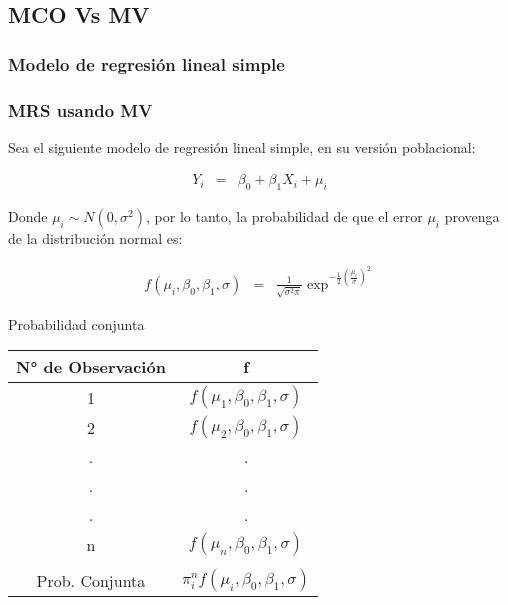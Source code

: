 \subsection{MCO Vs MV}

\subsubsection{Modelo de regresión lineal simple}

\begin{frame}
	\frametitle{MRS usando MV}
	
	Sea el siguiente modelo de regresión lineal simple, en su versión
	poblacional:
	
	\begin{eqnarray}
		Y_i &=& \beta_0+\beta_1 X_i+\mu_i
	\end{eqnarray}
	
	Donde $\mu_i \sim N(0,\sigma^2)$, por lo tanto, la probabilidad de
	que el error $\mu_i$ provenga de la distribución normal es:
	
	\begin{eqnarray}
		f(\mu_i,\beta_0,\beta_1,\sigma) &=&
		\frac{1}{\sqrt{\sigma^2\pi}}\exp^{-\frac{1}{2}(\frac{\mu_i}{\sigma})^2}
	\end{eqnarray}
\end{frame}

\begin{frame}
	
	Probabilidad conjunta
	
	\begin{table}
		\centering
		\begin{tabular}{c|c}
			N° de Observación & f \\
			\hline
			1 & $f(\mu_1,\beta_0,\beta_1,\sigma)$ \\
			2 & $f(\mu_2,\beta_0,\beta_1,\sigma)$ \\
			. & . \\
			. & . \\
			. & . \\
			n & $f(\mu_n,\beta_0,\beta_1,\sigma)$ \\
			\hline \\
			Prob. Conjunta & $\pi_i^n f(\mu_i,\beta_0,\beta_1,\sigma)$ \\
		\end{tabular}
	\end{table}
\end{frame}

